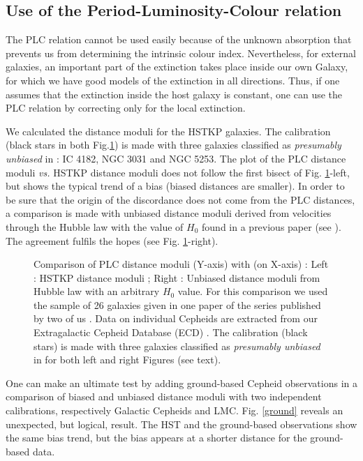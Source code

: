 \subsection{Use of the Period-Luminosity-Colour relation }
\label{sec3.3}
The PLC relation cannot be used easily because of the unknown absorption that prevents us from determining the intrinsic colour index. Nevertheless, for external galaxies, an important part of the extinction takes place inside our own Galaxy, for which we have good models of the extinction in all directions. Thus, if one assumes that the extinction inside the host galaxy is constant, one can use the PLC relation by correcting only for the local extinction. 

We calculated  \cite{Ref31} the distance moduli for the HSTKP galaxies. The calibration (black stars in both Fig.\ref{plc_hst}) is made with three galaxies classified as {\it{presumably unbiased}} in  \cite{Ref31}: IC 4182, NGC 3031 and NGC 5253. The plot of the PLC distance moduli {\it{vs.}} HSTKP distance moduli does not follow the first bisect of Fig. \ref{plc_hst}-left,  but shows the typical trend of a bias (biased distances are smaller). In order to be sure that the origin of the discordance does not come from the PLC distances, a comparison is made with unbiased distance moduli derived from velocities through the Hubble law with the value of $H_0$ found in a previous paper (see \cite{Ref31}). The agreement fulfils the hopes (see Fig. \ref{plc_hst}-right).

\begin{figure}
\caption{ Comparison of PLC distance moduli (Y-axis) with (on X-axis) : Left : HSTKP distance moduli ;
Right : Unbiased distance moduli from Hubble law with an arbitrary $H_0$ value. For this comparison we used the sample of 26 galaxies given in one paper of the series published by two of us \cite{Ref31}. Data on individual Cepheids are extracted from our Extragalactic Cepheid Database (ECD) \cite{lanoix}. The calibration (black stars) is made with three galaxies classified as {\it{presumably unbiased}} in  \cite{Ref31} for both left and right Figures (see text).}
\label{plc_hst} 
\end{figure}   

One can make an ultimate test by adding ground-based Cepheid observations in a comparison of biased and unbiased distance moduli with two independent calibrations, respectively Galactic Cepheids and LMC.  Fig. \ref{ground} reveals an unexpected, but logical, result. The HST and the ground-based observations  show the same bias trend, but the bias appears at a shorter distance for the ground-based data. 

